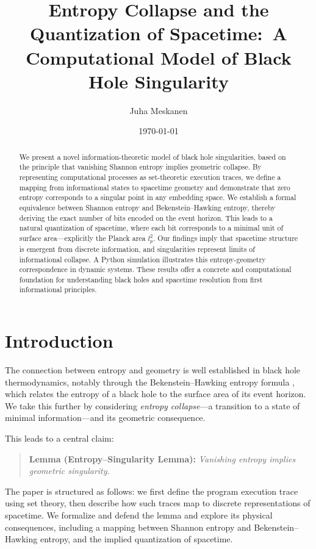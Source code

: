 \documentclass[11pt]{article}
\title{Entropy Collapse and the Quantization of Spacetime:\ A Computational Model of Black Hole Singularity}
\author{Juha Meskanen}
\date{\today}
\begin{document}
\maketitle

\begin{abstract}
We present a novel information-theoretic model of black hole singularities, based on the principle that vanishing Shannon 
entropy implies geometric collapse. By representing computational processes as set-theoretic execution traces, we define a mapping from informational states to spacetime geometry and demonstrate that zero entropy corresponds to a singular point in any embedding space. We establish a formal equivalence between Shannon entropy and Bekenstein--Hawking entropy, thereby deriving the exact number of bits encoded on the event horizon. This leads to a natural quantization of spacetime, where each bit corresponds to a minimal unit of surface area---explicitly the Planck area $l_p^2$. Our findings imply that spacetime structure is emergent from discrete information, and singularities represent limits of informational collapse. A Python simulation illustrates this entropy-geometry correspondence in dynamic systems. These results offer a concrete and computational foundation for understanding black holes and spacetime resolution from first informational principles.
\end{abstract}

\section{Introduction}

The connection between entropy and geometry is well established in black hole thermodynamics, notably through the Bekenstein--Hawking entropy formula \cite{Bekenstein1973,Hawking1975}, which relates the entropy of a black hole to the surface area of its event horizon. We take this further by considering \emph{entropy collapse}---a transition to a state of minimal information---and its geometric consequence.

This leads to a central claim:

\begin{quote}
\textbf{Lemma (Entropy--Singularity Lemma):} \emph{Vanishing entropy implies geometric singularity.}
\end{quote}

The paper is structured as follows: we first define the program execution trace using set theory, then describe how such traces map to discrete representations of spacetime. We formalize and defend the lemma and explore its physical consequences, including a mapping between Shannon entropy and Bekenstein--Hawking entropy, and the implied quantization of spacetime.
\end{document}
